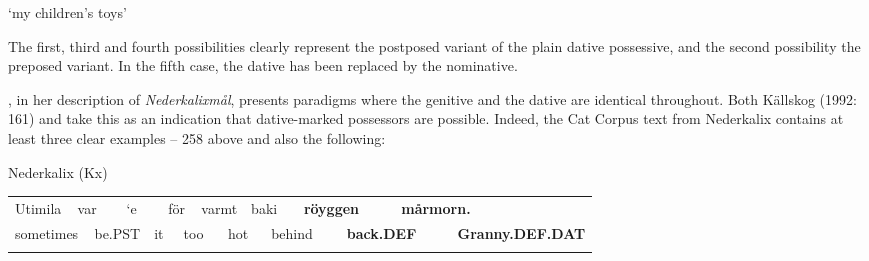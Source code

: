 \begin{styleTranslation}
‘my children’s toys’

\end{styleTranslation}

\begin{styleBodyTextFirst}
The first, third and fourth possibilities clearly represent the postposed variant of the plain dative possessive, and the second possibility the preposed variant. In the fifth case, the dative has been replaced by the nominative.  

\end{styleBodyTextFirst}

\begin{styleBodytextC}
\citet{Rutberg1924}, in her description of \textit{Nederkalixmål}, presents paradigms where the genitive and the dative are identical throughout. Both Källskog (1992: 161) and \citet[42]{Delsing2003a} take this as an indication that dative-marked possessors are possible. Indeed, the Cat Corpus text from Nederkalix contains at least three clear examples – 258 above and also the following:

\end{styleBodytextC}

\begin{listWWNumileveli}
\item 

\begin{styleExample}
Nederkalix (Kx)

\end{styleExample}

\end{listWWNumileveli}

\begin{tabular}{llllllllllllllll}
\lsptoprule
Utimila & \multicolumn{2}{l}{var

} & \multicolumn{2}{l}{‘e

} & \multicolumn{2}{l}{för

} & \multicolumn{2}{l}{varmt

} & \multicolumn{2}{l}{baki

} & \multicolumn{2}{l}{{\bfseries röyggen}

} & \multicolumn{2}{l}{{\bfseries mårmorn.}

} & \\
\multicolumn{2}{l}{sometimes

} & \multicolumn{2}{l}{be.PST

} & \multicolumn{2}{l}{it

} & \multicolumn{2}{l}{too

} & \multicolumn{2}{l}{hot

} & \multicolumn{2}{l}{behind

} & \multicolumn{2}{l}{{\bfseries back.DEF}

} & \multicolumn{2}{l}{{\bfseries Granny.DEF.DAT}

}\\
\lspbottomrule
\end{tabular}

